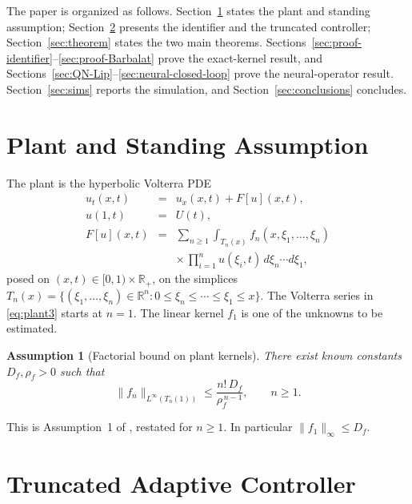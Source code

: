\documentclass[journal,twoside,web]{ieeecolor}
\newtheorem{assumption}{Assumption}
\begin{document}
The paper is organized as follows. Section~\ref{sec:plant} states the plant and standing assumption; Section~\ref{sec:design} presents the identifier and the truncated controller; Section~\ref{sec:theorem} states the two main theorems. Sections~\ref{sec:proof-identifier}--\ref{sec:proof-Barbalat} prove the exact-kernel result, and Sections~\ref{sec:QN-Lip}--\ref{sec:neural-closed-loop} prove the neural-operator result. Section~\ref{sec:sims} reports the simulation, and Section~\ref{sec:conclusions} concludes.
\section{Plant and Standing Assumption}\label{sec:plant}

The plant is the hyperbolic Volterra PDE
\begin{eqnarray}
u_t(x,t) &=& u_x(x,t)+F[u](x,t), \label{eq:plant1}\\
u(1,t) &=& U(t), \label{eq:plant2}\\
F[u](x,t) &=& \sum_{n\ge 1}\int_{T_n(x)}f_n(x,\xi_1,\ldots,\xi_n) \nonumber\\
&& \times\,\prod_{i=1}^n u(\xi_i,t)\,d\xi_n\cdots d\xi_1, \label{eq:plant3}
\end{eqnarray}
posed on $(x,t)\in[0,1)\times\mathbb{R}_+$, on the simplices $T_n(x)=\{(\xi_1,\ldots,\xi_n)\in\mathbb{R}^n:0\le\xi_n\le\cdots\le\xi_1\le x\}$. The Volterra series in \eqref{eq:plant3} starts at $n=1$. The linear kernel $f_1$ is one of the unknowns to be estimated.

\begin{assumption}[Factorial bound on plant kernels]\label{ass:factorial}
There exist known constants $D_f,\rho_f>0$ such that
\begin{equation}\label{eq:factorial}
\|f_n\|_{L^\infty(T_n(1))}\le \frac{n!\,D_f}{\rho_f^{\,n-1}},\qquad n\ge 1.
\end{equation}
\end{assumption}

This is Assumption~1 of \cite{HV1}, restated for $n\ge 1$. In particular $\|f_1\|_\infty\le D_f$.

\section{Truncated Adaptive Controller}\label{sec:design}
\end{document}
